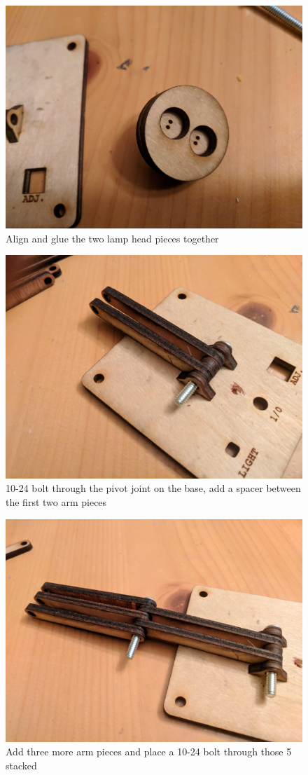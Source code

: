 \documentclass[a4paper]{article}
\begin{document}
\begin{figure}[h!]
\centerline{\includegraphics[width=.75\linewidth]{lamp3.jpg}}
\caption{Align and glue the two lamp head pieces together}
\end{figure}

\begin{figure}[h!]
\centerline{\includegraphics[width=.75\linewidth]{lamp4.jpg}}
\caption{10-24 bolt through the pivot joint on the base, add a spacer between the first two arm pieces}
\end{figure}

\begin{figure}[h!]
\centerline{\includegraphics[width=.75\linewidth]{lamp5.jpg}}
\caption{Add three more arm pieces and place a 10-24 bolt through those 5 stacked}
\end{figure}
\end{document}
